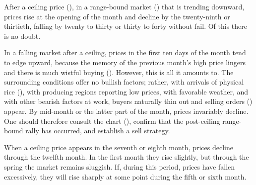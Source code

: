 

\begin{sokyubox}
{\small\itshape\color{sokyubar} }

\medskip
After a ceiling price (), in a range-bound
market () that is trending downward, prices
rise at the opening of the month and decline by the twenty-ninth
or thirtieth, falling by twenty to thirty or thirty to forty
 without fail. Of this there is no doubt.
\end{sokyubox}

\commentary
In a falling market after a ceiling, prices in the first ten days
of the month tend to edge upward, because the memory of the
previous month's high price lingers and there is much wistful
buying (). However, this is all it amounts to.
The surrounding conditions offer no bullish factors; rather, with
arrivals of physical rice (), with producing regions
reporting low prices, with favorable weather, and with other
bearish factors at work, buyers naturally thin out and selling
orders () appear. By mid-month or the latter part
of the month, prices invariably decline. One should therefore
consult the chart (), confirm that the
post-ceiling range-bound rally has occurred, and establish a sell
strategy.


\begin{sokyubox}
{\small\itshape\color{sokyubar} }

\medskip
When a ceiling price appears in the seventh or eighth month, prices
decline through the twelfth month. In the first month they rise
slightly, but through the spring the market remains sluggish. If,
during this period, prices have fallen excessively, they will rise
sharply at some point during the fifth or sixth month.
\end{sokyubox}

